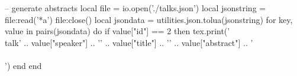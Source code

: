 \begin{luacode}
  -- generate abstracts
  local file = io.open('./talks.json')
  local jsonstring = file:read('*a')
  file:close()
  local jsondata =  utilities.json.tolua(jsonstring)
  for key, value in pairs(jsondata) do
    if value["id"] == 2 then 
        tex.print('\\talk{' .. 
          value["speaker"]  .. 
          '}{'              .. 
          value["title"]    .. 
          '}{'              .. 
          value["abstract"] .. 
          '}\\\\[1em]')
    end
  end
\end{luacode}